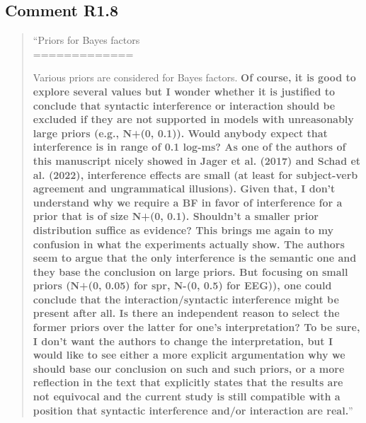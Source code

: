 \documentclass[12pt]{article}
\begin{document}
\subsection*{Comment R1.8}
\begin{quote}
``Priors for Bayes factors\\
=============

Various priors are considered for Bayes factors. \textbf{Of course, it is good to explore several values but I wonder whether it is justified to conclude that syntactic interference or interaction should be excluded if they are not supported in models with unreasonably large priors (e.g., N+(0, 0.1)). Would anybody expect that interference is in range of 0.1 log-ms? As one of the authors of this manuscript nicely showed in Jager et al. (2017) and Schad et al. (2022), interference effects are small (at least for subject-verb agreement and ungrammatical illusions). Given that, I don't understand why we require a BF in favor of interference for a prior that is of size N+(0, 0.1). Shouldn't a smaller prior distribution suffice as evidence? This brings me again to my confusion in what the experiments actually show. The authors seem to argue that the only interference is the semantic one and they base the conclusion on large priors. But focusing on small priors (N+(0, 0.05) for spr, N-(0, 0.5) for EEG)), one could conclude that the interaction/syntactic interference might be present after all. Is there an independent reason to select the former priors over the latter for one's interpretation? To be sure, I don't want the authors to change the interpretation, but I would like to see either a more explicit argumentation why we should base our conclusion on such and such priors, or a more reflection in the text that explicitly states that the results are not equivocal and the current study is still compatible with a position that syntactic interference and/or interaction are real.}''\end{quote}
\end{document}
